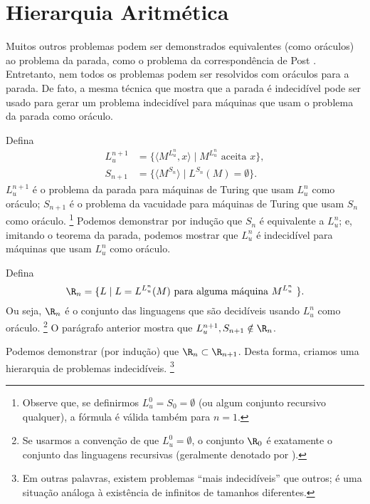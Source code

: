 \section{Hierarquia Aritmética}
\label{sec:arithmetical_hierarchy}

Muitos outros problemas podem ser demonstrados equivalentes
(como oráculos)
ao problema da parada,
como o problema da correspondência de Post \cite[p.~214]{HopcroftUllman1979}.
Entretanto,
nem todos os problemas podem ser resolvidos com oráculos para a parada.
De fato, a mesma técnica que mostra que a parada é indecidível
pode ser usado para gerar um problema indecidível
para máquinas que usam o problema da parada como oráculo.

Defina
\begin{align*}
    L_u^{n+1} &= \{ \langle M^{L_u^n}, x \rangle \mid M^{L_u^n} \text{ aceita } x \}, \\
    S_{n+1} &= \{ \langle M^{S_n} \rangle \mid L^{S_n}(M) = \emptyset \}.
\end{align*}
$L_u^{n+1}$ é o problema da parada
para máquinas de Turing que usam $L_u^n$ como oráculo;
$S_{n+1}$ é o problema da vacuidade
para máquinas de Turing que usam $S_n$ como oráculo.%
\footnote{
    Observe que,
    se definirmos $L_u^0 = S_0 = \emptyset$
    (ou algum conjunto recursivo qualquer),
    a fórmula é válida também para $n = 1$.
}
Podemos demonstrar por indução que $S_n$ é equivalente a $L_u^n$;
e, imitando o teorema da parada,
podemos mostrar que $L_u^n$ é indecidível para máquinas que usam $L_u^n$ como oráculo.

Defina
\begin{equation*}
    \R_n = \{ L \mid L = L^{L_u^n}(M) \text{ para alguma máquina $M^{L_u^n}$ } \}.
\end{equation*}
Ou seja, $\R_n$ é o conjunto das linguagens
que são decidíveis usando $L_u^n$ como oráculo.%
\footnote{
    Se usarmos a convenção de que $L_u^0 = \emptyset$,
    o conjunto $\R_0$ é exatamente o conjunto das linguagens recursivas
    (geralmente denotado por \R).
}
O parágrafo anterior mostra que $L_u^{n+1}, S_{n+1} \notin \R_n$.

Podemos demonstrar (por indução) que $\R_n \subset \R_{n+1}$.
Desta forma,
criamos uma hierarquia de problemas indecidíveis.%
\footnote{
    Em outras palavras,
    existem problemas ``mais indecidíveis'' que outros;
    é uma situação análoga à existência de infinitos de tamanhos diferentes.
}

